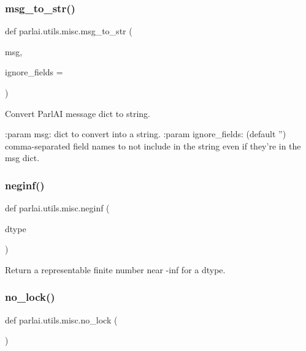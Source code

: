 \subsubsection{\texorpdfstring{msg\+\_\+to\+\_\+str()}{msg\_to\_str()}}
{\footnotesize\ttfamily def parlai.\+utils.\+misc.\+msg\+\_\+to\+\_\+str (\begin{DoxyParamCaption}\item[{}]{msg,  }\item[{}]{ignore\+\_\+fields = {\ttfamily \textquotesingle{}\textquotesingle{}} }\end{DoxyParamCaption})}

\begin{DoxyVerb}Convert ParlAI message dict to string.

:param msg:
    dict to convert into a string.
:param ignore_fields:
    (default '') comma-separated field names to not include in the string
    even if they're in the msg dict.
\end{DoxyVerb}
 \mbox{\label{namespaceparlai_1_1utils_1_1misc_a68c44ca571de7149b683539db659c330}} 
\subsubsection{\texorpdfstring{neginf()}{neginf()}}
{\footnotesize\ttfamily def parlai.\+utils.\+misc.\+neginf (\begin{DoxyParamCaption}\item[{}]{dtype }\end{DoxyParamCaption})}

\begin{DoxyVerb}Return a representable finite number near -inf for a dtype.
\end{DoxyVerb}
 \mbox{\label{namespaceparlai_1_1utils_1_1misc_a38a23cfa0fc3dbed42846787d1c04b57}} 
\subsubsection{\texorpdfstring{no\+\_\+lock()}{no\_lock()}}
{\footnotesize\ttfamily def parlai.\+utils.\+misc.\+no\+\_\+lock (\begin{DoxyParamCaption}{ }\end{DoxyParamCaption})}

